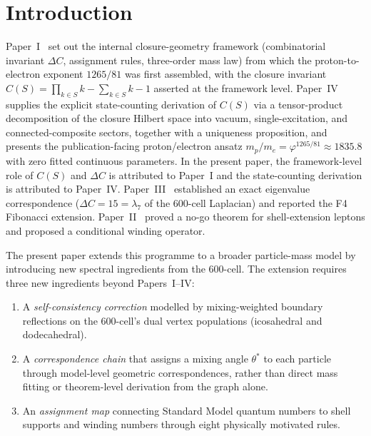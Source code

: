 \documentclass[12pt]{article}
\newcommand{\phig}{\varphi}
\begin{document}
\section{Introduction}\label{sec:intro}

Paper~I~\citep{SmartI} set out the internal closure-geometry framework (combinatorial invariant $\Delta C$, assignment rules, three-order mass law) from which the proton-to-electron exponent $1265/81$ was first assembled, with the closure invariant $C(S) = \prod_{k \in S} k - \sum_{k \in S} k - 1$ asserted at the framework level. Paper~IV~\citep{SmartIV} supplies the explicit state-counting derivation of $C(S)$ via a tensor-product decomposition of the closure Hilbert space into vacuum, single-excitation, and connected-composite sectors, together with a uniqueness proposition, and presents the publication-facing proton/electron ansatz $m_p/m_e = \phig^{1265/81} \approx 1835.8$ with zero fitted continuous parameters. In the present paper, the framework-level role of $C(S)$ and $\Delta C$ is attributed to Paper~I and the state-counting derivation is attributed to Paper~IV. Paper~III~\citep{SmartIII} established an exact eigenvalue correspondence ($\Delta C = 15 = \lambda_7$ of the 600-cell Laplacian) and reported the F4 Fibonacci extension. Paper~II~\citep{SmartII} proved a no-go theorem for shell-extension leptons and proposed a conditional winding operator.

The present paper extends this programme to a broader particle-mass model by introducing new spectral ingredients from the 600-cell. The extension requires three new ingredients beyond Papers~I--IV:

\begin{enumerate}
    \item A \textit{self-consistency correction} modelled by mixing-weighted boundary reflections on the 600-cell's dual vertex populations (icosahedral and dodecahedral).
    \item A \textit{correspondence chain} that assigns a mixing angle $\theta^*$ to each particle through model-level geometric correspondences, rather than direct mass fitting or theorem-level derivation from the graph alone.
    \item An \textit{assignment map} connecting Standard Model quantum numbers to shell supports and winding numbers through eight physically motivated rules.
\end{enumerate}
\end{document}
